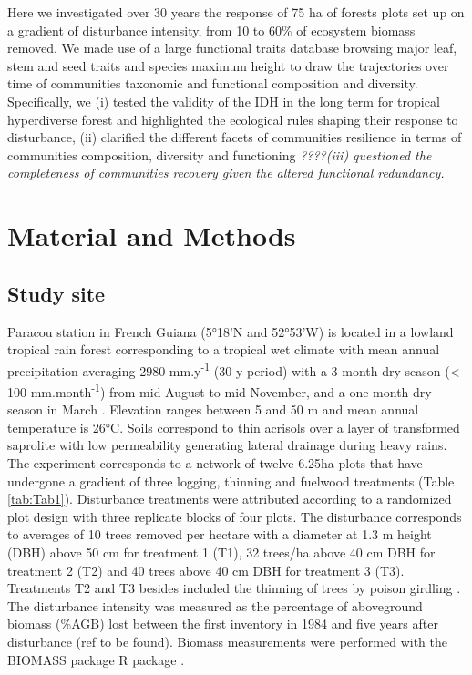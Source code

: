 \documentclass[fleqn,10pt]{ArtEcoFoG} %
\theoremstyle{definition}
\theoremstyle{definition}
\theoremstyle{definition}
\theoremstyle{remark}
\begin{document}
Here we investigated over 30 years the response of 75 ha of forests
plots set up on a gradient of disturbance intensity, from 10 to 60\% of
ecosystem biomass removed. We made use of a large functional traits
database browsing major leaf, stem and seed traits and species maximum
height to draw the trajectories over time of communities taxonomic and
functional composition and diversity. Specifically, we (i) tested the
validity of the IDH in the long term for tropical hyperdiverse forest
and highlighted the ecological rules shaping their response to
disturbance, (ii) clarified the different facets of communities
resilience in terms of communities composition, diversity and
functioning \emph{????(iii) questioned the completeness of communities
recovery given the altered functional redundancy.}

\section{Material and Methods}\label{material-and-methods}

\subsection{Study site}\label{study-site}

Paracou station in French Guiana (5°18'N and 52°53'W) is located in a
lowland tropical rain forest corresponding to a tropical wet climate
with mean annual precipitation averaging 2980 mm.y\textsuperscript{-1}
(30-y period) with a 3-month dry season (\textless{} 100
mm.month\textsuperscript{-1}) from mid-August to mid-November, and a
one-month dry season in March \citep{Wagner2011}. Elevation ranges
between 5 and 50 m and mean annual temperature is 26°C. Soils correspond
to thin acrisols over a layer of transformed saprolite with low
permeability generating lateral drainage during heavy rains. The
experiment corresponds to a network of twelve 6.25ha plots that have
undergone a gradient of three logging, thinning and fuelwood treatments
(Table \ref{tab:Tab1}). Disturbance treatments were attributed according
to a randomized plot design with three replicate blocks of four plots.
The disturbance corresponds to averages of 10 trees removed per hectare
with a diameter at 1.3 m height (DBH) above 50 cm for treatment 1 (T1),
32 trees/ha above 40 cm DBH for treatment 2 (T2) and 40 trees above 40
cm DBH for treatment 3 (T3). Treatments T2 and T3 besides included the
thinning of trees by poison girdling \citep{Blanc2009}. The disturbance
intensity was measured as the percentage of aboveground biomass (\%AGB)
lost between the first inventory in 1984 and five years after
disturbance (ref to be found). Biomass measurements were performed with
the BIOMASS package R package \citep{Biomass2018}.
\end{document}
